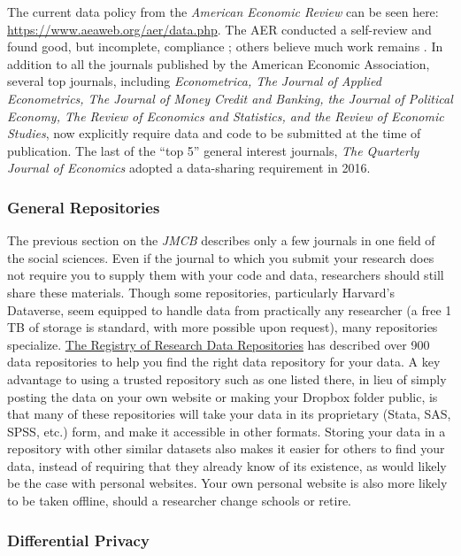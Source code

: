 \documentclass[12pt] {article}
\begin{document}
The current data policy from the \emph{American Economic Review} can be
seen here: \url{https://www.aeaweb.org/aer/data.php}. The AER conducted a self-review and
found good, but incomplete, compliance \citep{glandon_report_2010}; others believe much work remains \citep{anderson_role_2008}. In addition to all
the journals published by the American Economic Association, several top journals, including \emph{Econometrica, The Journal of Applied
Econometrics, The Journal of Money Credit and Banking, the Journal of
Political Economy, The Review of Economics and Statistics, and the
Review of Economic Studies}, now explicitly require data and code to be
submitted at the time of publication. The last of the ``top 5'' general interest journals, \textit{The Quarterly Journal of Economics} adopted a data-sharing requirement in 2016.


\subsubsection{General Repositories}\label{general-repositories}

The previous section on the \emph{JMCB} describes only a few journals in
one field of the social sciences. Even if the journal to which you
submit your research does not require you to supply them with your code
and data, researchers should still share these materials. Though some
repositories, particularly Harvard's Dataverse, seem equipped to handle
data from practically any researcher (a free 1 TB of storage is
standard, with more possible upon request), many repositories specialize. \href{http://www.re3data.org}{The Registry of Research Data Repositories}
has described over 900 data repositories to help you find the right data
repository for your data. A key advantage to using a trusted repository
such as one listed there, in lieu of simply posting the data on your
own website or making your Dropbox folder public, is that many of these
repositories will take your data in its proprietary (Stata, SAS, SPSS,
etc.) form, and make it accessible in other formats. Storing your data in a repository with other similar datasets also makes it easier for others to find your data, instead of requiring that they already know of its existence, as would likely be the case with personal websites. Your own personal website is also more likely to be taken offline, should a researcher change schools or retire.

\subsubsection{Differential Privacy}\label{differential-privacy}
\end{document}

